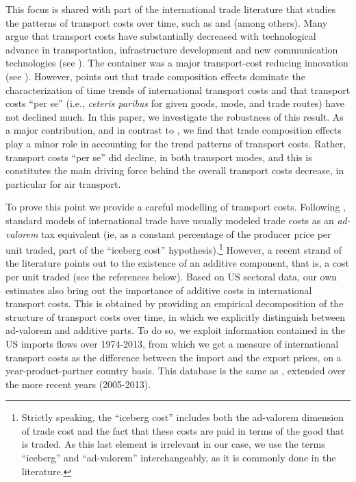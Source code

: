 \documentclass[a4paper,11pt]{article}
\begin{document}
This focus is shared with part of the international trade literature that studies the patterns of transport costs over time, such as \cite{hummels2007} and \cite{Behar_Venables} (among others). Many argue that transport costs have substantially decreased with technological advance in transportation, infrastructure development and new communication technologies (see \citealp{Lafourcade_Thisse}). %
The container was a major transport-cost reducing innovation (see \citealp{levinson2016box}). However, \cite{hummels2007} points out that trade composition effects dominate the characterization of time trends of international transport costs and that transport costs ``per se'' (i.e., \textit{ceteris paribus} for given goods, mode, and trade routes) have not declined much. In this paper, we investigate the robustness of this result. As a major contribution, and in contrast to \cite{hummels2007}, we find that trade composition effects play a minor role in accounting for the trend patterns of transport costs. Rather, transport costs ``per se'' did decline, in both transport modes, and this is constitutes the main driving force behind the overall transport costs decrease, in particular for air transport.\medskip

To prove this point we provide a careful modelling of transport costs. Following \citet{samuelson1954}, standard models of international trade have usually modeled trade costs as an \emph{ad-valorem} tax equivalent (ie, as a constant percentage of the producer price per unit traded, part of the ``iceberg cost'' hypothesis).\footnote{Strictly speaking, the ``iceberg cost'' includes both the ad-valorem dimension of trade cost and the fact that these costs are paid in terms of the good that is traded. As this last element is irrelevant in our case, we use the terms ``iceberg'' and ``ad-valorem'' interchangeably, as it is commonly done in the literature.} However, a recent strand of the literature points out to the existence of an additive component, that is, a cost per unit traded (see the references below). Based on US sectoral data, our own estimates also bring out the importance of additive costs in international transport costs. This is obtained by providing an empirical decomposition of the structure of transport costs over time, in which we explicitly distinguish between ad-valorem and additive parts. To do so, we exploit information contained in the US imports flows over 1974-2013, from which we get a measure of international transport costs as the difference between the import and the export prices, on a year-product-partner country basis. This database is the same as \cite{hummels2007}, extended over the more recent years (2005-2013). \smallskip
\end{document}
